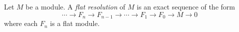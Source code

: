 \documentclass[12pt]{article}
\begin{document}
Let $M$ be a module.  A {\it flat resolution} of $M$
is an exact sequence of the form
$$\cdots \to F_n \to F_{n-1} \to \cdots \to F_1 \to F_0 \to M \to 0$$
where each $F_n$ is a flat module.
\end{document}
